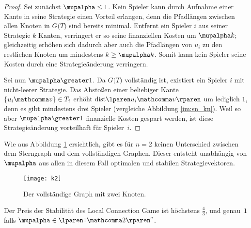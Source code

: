 \begin{proof}
  Sei zunächst $\mupalpha \leq 1$.
  Kein Spieler kann durch Aufnahme einer Kante in seine Strategie
  einen Vorteil erlangen,
  denn die Pfadlängen zwischen allen Knoten in $G \lparen T \rparen$
  sind bereits minimal.
  Entfernt ein Spieler $i$ aus seiner Strategie $k$ Kanten,
  verringert er so seine finanziellen Kosten um $\mupalpha k$;
  gleichzeitig erhöhen sich dadurch aber auch die Pfadlängen
  von $u_i$ zu den restlichen Knoten um mindestens $k \geq \mupalpha k$.
  Somit kann kein Spieler seine Kosten durch eine Strategieänderung verringern.

  Sei nun $\mupalpha \greater 1$.
  Da $G \lparen T \rparen$ vollständig ist,
  existiert ein Spieler $i$ mit nicht-leerer Strategie.
  Das Abstoßen einer beliebiger Kante $\lbrace u_i \mathcomma v \rbrace \in T_i$
  erhöht $\dist{u_i}{v}$ um lediglich $1$,
  denn es gibt mindestens drei Spieler (vergleiche Abbildung \ref{im:sn_kn}).
  Weil so aber $\mupalpha \greater 1$ finanzielle Kosten gespart werden,
  ist diese Strategieänderung vorteilhaft für Spieler~$i$.
\end{proof}

\begin{bemerkung}
  Wie aus Abbildung \ref{im:k2} ersichtlich,
  gibt es für $n \equal 2$ keinen Unterschied
  zwischen dem Sterngraph und dem vollständigen Graphen.
  Dieser entsteht unabhängig von $\mupalpha$
  aus allen in diesem Fall optimalen und stabilen Strategievektoren.
  \begin{figure}[h]
    \centering
    \texttt{[image: k2]}
    \caption{Der vollständige Graph mit zwei Knoten.}
    \label{im:k2}
  \end{figure}
\end{bemerkung}

\begin{satz}
  Der Preis der Stabilität des Local Connection Game
  ist höchstens $\frac{4}{3}$,
  und genau~$1$
  falls $\mupalpha \in \lparen 1 \mathcomma 2 \rparen ^\mathrm{c}$.
\end{satz}

